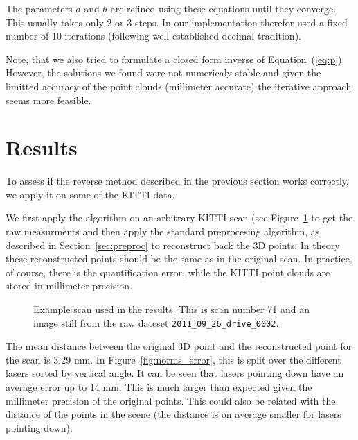 \documentclass[english]{article}
\begin{document}
The parameters $d$ and $\theta$ are refined using these equations until they
converge. This usually takes only 2 or 3 steps. In our implementation therefor
used a fixed number of 10 iterations (following well established decimal
tradition).

Note, that we also tried to formulate a closed form inverse of
Equation~(\ref{eq:p}). However, the solutions we found were not numericaly
stable and given the limitted accuracy of the point clouds (millimeter accurate)
the iterative approach seems more feasible.

\section{Results}
To assess if the reverse method described in the previous section works
correctly, we apply it on some of the KITTI data.

We first apply the algorithm on an arbitrary KITTI scan (see Figure~\ref{fig:example} to get the raw measurments and then
apply the standard preprocesing algorithm, as described in
Section~\ref{sec:preproc} to reconstruct back the 3D points. In theory these
reconstructed points should be the same as in the original scan. In practice, of
course, there is the quantification error, while the KITTI point clouds are
stored in millimeter precision.

\begin{figure}
  \begin{center}
      \caption{Example scan used in the results. This is scan number 71 and an
      image still from the raw dateset \texttt{2011\_09\_26\_drive\_0002}.}
  \label{fig:example}
  \end{center}
\end{figure}

The mean distance between the original 3D point and the reconstructed point for
the scan is 3.29 mm. In Figure~\ref{fig:norms_error}, this is split over the
different lasers sorted by vertical angle. It can be seen that lasers pointing
down have an average error up to 14 mm. This is much larger than expected given
the millimeter precision of the original points. This could also be related with
the distance of the points in the scene (the distance is on average smaller for
lasers pointing down).
\end{document}
